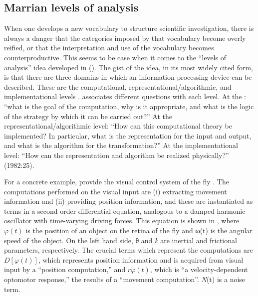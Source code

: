 \subsection{Marrian levels of analysis}

When one develops a new vocabulary to structure scientific investigation, there is always a danger that the categories imposed by that vocabulary become overly reified, or that the interpretation and use of the vocabulary becomes counterproductive. This seems to be case when it comes to the “levels of analysis” idea developed in (\citealt{Marr1982,MarrPoggio1977}). The gist of the idea, in its most widely cited form, is that there are three domains in which an information processing device can be described. These are the computational, representational/algorithmic, and implementational levels \citep{Marr1982}. \citet{Marr1982} associates different questions with each level. At the : “what is the goal of the computation, why is it appropriate, and what is the logic of the strategy by which it can be carried out?” At the representational/algorithmic level: “How can this computational theory be implemented? In particular, what is the representation for the input and output, and what is the algorithm for the transformation?” At the implementational level: “How  can the representation and algorithm be realized physically?” (1982:25).

  For a concrete example, \citet{MarrPoggio1977} provide the visual control system of the fly \citep{ReichardtPoggio1976}. The computations performed on the visual input are (i) extracting movement information and (ii) providing position information, and these are instantiated as terms in a second order differential equation, analogous to a damped harmonic oscillator with time-varying driving forces. This equation is shown in , where  $\varphi(t)$ is the position of an object on the retina of the fly and ω(t) is the angular speed of the object. On the left hand side, θ and \textit{k} are inertial and frictional parameters, respectively. The crucial terms which represent the computations are  $D\left[\varphi \left(t\right)\right]$, which represents position information and is acquired from visual input by a “position computation,” and  $r\Dot{{\varphi} }\left(t\right)$, which is “a velocity-dependent optomotor response,” the results of a “movement computation”. \textit{N}(t) is a noise term.


